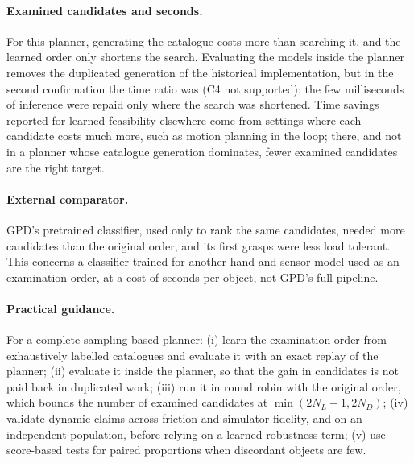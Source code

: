 \paragraph{Examined candidates and seconds.} For this planner, generating the catalogue costs more than searching it, and the learned order only shortens the search. Evaluating the models inside the planner removes the duplicated generation of the historical implementation, but in the second confirmation the time ratio was \nxCfourEff{} \nxCfourCI{} (C4 not supported): the few milliseconds of inference were repaid only where the search was shortened. Time savings reported for learned feasibility elsewhere \cite{qin2026planned,jiang2022suction} come from settings where each candidate costs much more, such as motion planning in the loop; there, and not in a planner whose catalogue generation dominates, fewer examined candidates are the right target.

\paragraph{External comparator.} GPD's pretrained classifier, used only to rank the same candidates, needed more candidates than the original order, and its first grasps were less load tolerant. This concerns a classifier trained for another hand and sensor model used as an examination order, at a cost of seconds per object, not GPD's full pipeline.

\paragraph{Practical guidance.} For a complete sampling-based planner: (i) learn the examination order from exhaustively labelled catalogues and evaluate it with an exact replay of the planner; (ii) evaluate it inside the planner, so that the gain in candidates is not paid back in duplicated work; (iii) run it in round robin with the original order, which bounds the number of examined candidates at $\min(2N_L-1, 2N_D)$; (iv) validate dynamic claims across friction and simulator fidelity, and on an independent population, before relying on a learned robustness term; (v) use score-based tests for paired proportions when discordant objects are few.

